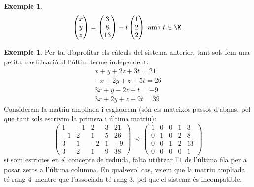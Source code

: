 \documentclass[a4paper,12pt,twoside]{article}
\newcommand{\1}{\mathbf{1}}
\newcommand{\0}{\mathbf{0}}
\theoremstyle{definition}
\newtheorem{exemple}[teorema]{Exemple}
\theoremstyle{remark}
\begin{document}
\begin{exemple}
$$
\begin{pmatrix}
x \\ y \\ z
\end{pmatrix} =
\begin{pmatrix}
3 \\ 8 \\ 13
\end{pmatrix}-
t \begin{pmatrix}
1 \\ 2 \\ 2
\end{pmatrix} \text{ amb $t\in\K$.}
$$
\end{exemple}
\begin{exemple}
	Per tal d'aprofitar els càlculs del sistema anterior, tant sols fem una petita modificació al l'últim terme independent:
	$$
	\begin{array}{c}
	x + y + 2z + 3t = 21 \\
	-x+2y+z+5t=26\\
	3x+y-2z+t=-9\\
	3x+2y+z+9t=39
	\end{array}
	$$
	Considerem la matriu ampliada i esglaonem (són els mateixos passos d'abans, pel que tant sols escrivim la primera i última matriu):
$$\left(\begin{array}{cccc|c}
1 & -1 & 2 & 3 & 21 \\
-1 & 2 & 1 & 5 & 26 \\
3 & 1 & -2 & 1 & -9\\
3 & 2 & 1 & 9 & 38
\end{array}
\right)
\rightsquigarrow	
\left(\begin{array}{cccc|c}
1 & 0 & 0 & 1 & 3 \\
0 & 1 & 0 & 2 & 8 \\
0 & 0 & 1 & 2 & 13\\
0 & 0 & 0 &  0 & 1
\end{array}
\right)
$$
si som estrictes en el concepte de reduïda, falta utilitzar l'$1$ de l'última fila per a posar zeros a l'última columna. En qualsevol cas, veiem que la matriu ampliada té rang 4, mentre que l'associada té rang 3, pel que el sistema és incompatible.
\end{exemple}
\end{document}
